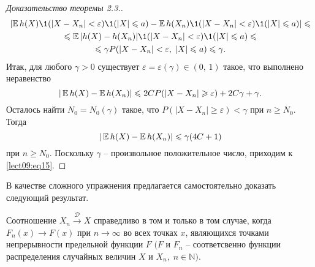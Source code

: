\begin{proof}[Доказательство теоремы 2.3.]
\begin{multline*}
\left|\E h(X)\1(|X-X_n|<\varepsilon)\1(|X|\leqslant a)-\E h(X_n)\1(|X-X_n|<\varepsilon)\1(|X|\leqslant a)\right|\leqslant\\\leqslant\E|h(X)-h(X_n)|\1(|X-X_n|<\varepsilon)\1(|X|\leqslant a)\leqslant\\\leqslant\gamma P(|X-X_n|<\varepsilon,\;|X|\leqslant a)\leqslant\gamma.
\end{multline*}
Итак, для любого $\gamma>0$ существует $\varepsilon=\varepsilon(\gamma)\in(0,\,1)$ такое, что выполнено неравенство
\[ |\operatorname*{\mathbb{E}} h(X)-\operatorname*{\mathbb{E}} h(X_n)|\leqslant 2CP(|X-X_n|\geqslant\varepsilon)+2C\gamma+\gamma. \]
Осталось найти $N_0=N_0(\gamma)$ такое, что $P(|X-X_n|\geqslant\varepsilon)<\gamma$ при $n\geqslant N_0$. Тогда
\[ |\operatorname*{\mathbb{E}} h(X)-\operatorname*{\mathbb{E}} h(X_n)|\leqslant\gamma(4C+1) \]
при $n\geqslant N_0$. Поскольку $\gamma$ -- произвольное положительное число, приходим к \ref{lect09:eq15}.
\end{proof}

В качестве сложного упражнения предлагается самостоятельно доказать следующий результат.

\begin{theorem}\label{lect09:th4}
Соотношение $X_n\overset{\mathcal{D}}{\to}X$ справедливо в том и только в том случае, когда $F_n(x)\to F(x)$ при $n\to\infty$ во всех точках $x$, являющихся точками непрерывности предельной функции $F$ $(F$ и $F_n$ -- соответсвенно функции распределения случайных величин $X$ и $X_n,\;n\in\mathbb{N})$.
\end{theorem}